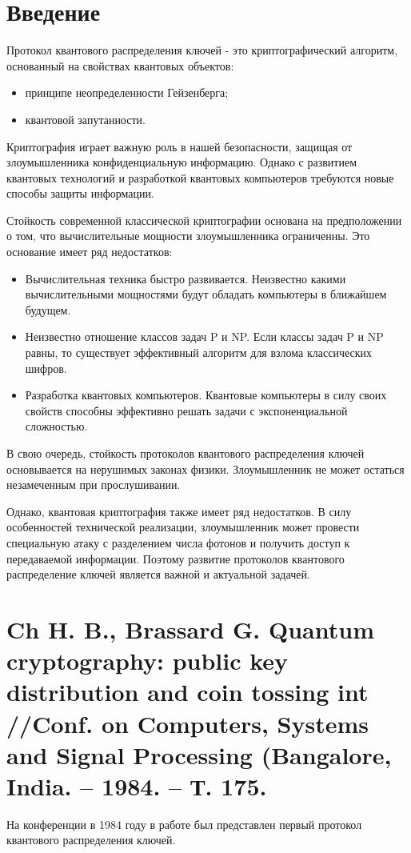 





\section*{Введение}
Протокол квантового распределения ключей - это криптографический алгоритм, основанный на свойствах квантовых объектов:

\begin{itemize}
\item принципе неопределенности Гейзенберга;
\item квантовой запутанности.
\end{itemize}

Криптография играет важную роль в нашей безопасности, защищая от злоумышленника конфиденциальную информацию. Однако с развитием квантовых технологий и разработкой квантовых компьютеров требуются новые способы защиты информации.

Стойкость современной классической криптографии основана на предположении о том, что вычислительные мощности злоумышленника ограниченны. Это основание имеет ряд недостатков:

\begin{itemize}
\item Вычислительная техника быстро развивается. Неизвестно какими вычислительными мощностями будут обладать компьютеры в ближайшем будущем.
\item Неизвестно отношение классов задач P и NP. Если классы задач P и NP равны, то существует эффективный алгоритм для взлома классических шифров.
\item Разработка квантовых компьютеров. Квантовые компьютеры в силу своих свойств способны эффективно решать задачи с экспоненциальной сложностью.
\end{itemize}

В свою очередь, стойкость протоколов квантового распределения ключей основывается на нерушимых законах физики. Злоумышленник не может остаться незамеченным при прослушивании.

Однако, квантовая криптография также имеет ряд недостатков. В силу особенностей технической реализации, злоумышленник может провести специальную атаку с разделением числа фотонов и получить доступ к передаваемой информации. Поэтому развитие протоколов квантового распределение ключей является важной и актуальной задачей.


\section{Ch H. B., Brassard G. Quantum cryptography: public key distribution and coin tossing int //Conf. on Computers, Systems and Signal Processing (Bangalore, India. – 1984. – Т. 175.}
На конференции в 1984 году в работе \cite{ch1984quantum} был представлен первый протокол квантового распределения ключей.

